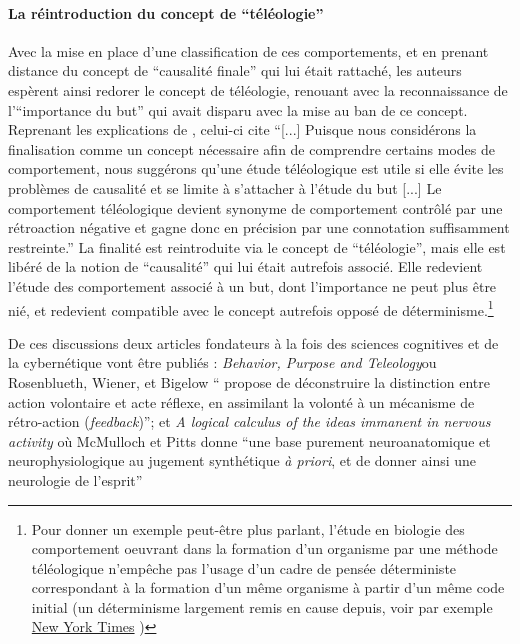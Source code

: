 
\paragraph{La réintroduction du concept de \enquote{téléologie}}

Avec la mise en place d'une classification de ces comportements, et en prenant distance du concept de \enquote{causalité finale} qui lui était rattaché, les auteurs espèrent ainsi redorer le concept de téléologie, renouant avec la reconnaissance de l'\enquote{importance du but} qui avait disparu avec la mise au ban de ce concept. Reprenant les explications de \autocite[776]{Pouvreau2013}, celui-ci cite \autocite[23-24]{Rosenblueth1943} \enquote{[...] Puisque nous considérons la finalisation comme un concept nécessaire afin de comprendre certains modes de comportement, nous suggérons qu'une étude téléologique est utile si elle évite les problèmes de causalité et se limite à s'attacher à l'étude du but [...] Le comportement téléologique devient synonyme de comportement contrôlé par une rétroaction négative et gagne donc en précision par une connotation suffisamment restreinte.} La finalité est reintroduite via le concept de \enquote{téléologie}, mais elle est libéré de la notion de \enquote{causalité} qui lui était autrefois associé. Elle redevient l'étude des comportement associé à un but, dont l'importance ne peut plus être nié, et redevient compatible avec le concept autrefois opposé de déterminisme.\footnote{Pour donner un exemple peut-être plus parlant, l'étude en biologie des comportement oeuvrant dans la formation d'un organisme par une méthode téléologique n'empêche pas l'usage d'un cadre de pensée déterministe  correspondant à la formation d'un même organisme à partir d'un même code initial (un déterminisme largement remis en cause depuis, voir par exemple \href{http://www.nytimes.com/2014/01/21/science/seeing-x-chromosomes-in-a-new-light.html?ref=science&_r=0}{New York Times} )}

De ces discussions deux articles fondateurs à la fois des sciences cognitives \autocite[23]{Dupuy2000} et de la cybernétique vont être publiés : \textit{Behavior, Purpose and Teleology}ou Rosenblueth, Wiener, et Bigelow \enquote{ propose de déconstruire la distinction entre action volontaire et acte réflexe, en assimilant la volonté à un mécanisme de rétro-action (\textit{feedback})}; et \textit{A logical calculus of the ideas immanent in nervous activity} où McMulloch et Pitts donne \enquote{une base purement neuroanatomique et neurophysiologique au jugement synthétique \textit{à priori}, et de donner ainsi une neurologie de l'esprit}

